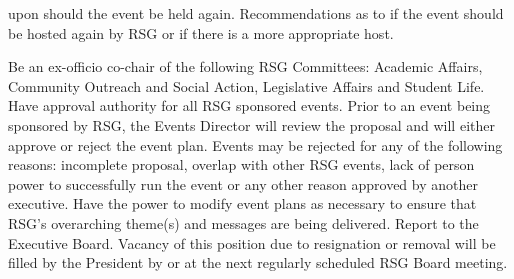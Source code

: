 \begin{enumsubsection}
\begin{enumsubsubsection}
upon should the event be held again.
\itemnotoc Recommendations as to if the event should be hosted again by RSG 
or if there is a more appropriate host. 
\end{enumsubsubsection}
\itemnotoc Be an ex-officio co-chair of the following RSG Committees: Academic 
Affairs, Community Outreach and Social Action, Legislative Affairs and 
Student Life. 
\itemnotoc Have approval authority for all RSG sponsored events. Prior to an event 
being sponsored by RSG, the Events Director will review the proposal and 
will either approve or reject the event plan. Events may be rejected for any 
of the following reasons: incomplete proposal, overlap with other RSG 
events, lack of person power to successfully run the event or any other 
reason approved by another executive. 
\itemnotoc Have the power to modify event plans as necessary to ensure that RSG's 
overarching theme(s) and messages are being delivered.
\itemnotoc Report to the Executive Board.
\itemnotoc Vacancy of this position due to resignation or removal will be filled by the 
President by or at the next regularly scheduled RSG Board meeting. 
\end{enumsubsection}

